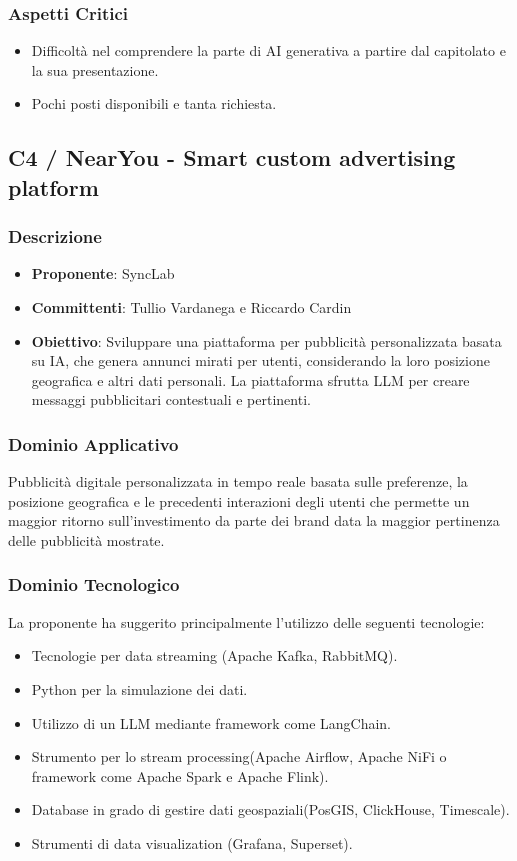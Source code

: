 \documentclass[a4paper, 12pt]{article}
\begin{document}
\subsubsection{Aspetti Critici}
\begin{itemize}
    \item Difficoltà nel comprendere la parte di AI generativa a partire dal capitolato e la sua presentazione.
    \item Pochi posti disponibili e tanta richiesta.
\end{itemize}

\subsection{C4 / NearYou - Smart custom advertising platform}
\subsubsection{Descrizione}
\begin{itemize}
    \item \textbf{Proponente}: SyncLab 
    \item \textbf{Committenti}: Tullio Vardanega e Riccardo Cardin
    \item \textbf{Obiettivo}: Sviluppare una piattaforma per pubblicità personalizzata basata su IA, che genera annunci mirati per utenti, considerando la loro posizione geografica e altri dati personali. La piattaforma sfrutta LLM per creare messaggi pubblicitari contestuali e pertinenti.
\end{itemize}

\subsubsection{Dominio Applicativo}
Pubblicità digitale personalizzata in tempo reale basata sulle preferenze, la posizione geografica e le precedenti interazioni degli utenti che permette un maggior ritorno sull’investimento da parte dei brand data la maggior pertinenza delle pubblicità mostrate.

\subsubsection{Dominio Tecnologico}
La proponente ha suggerito principalmente l’utilizzo delle seguenti tecnologie:
\begin{itemize}
    \item Tecnologie per data streaming (Apache Kafka, RabbitMQ).
    \item Python per la simulazione dei dati.
    \item Utilizzo di un LLM mediante framework come LangChain.
    \item Strumento per lo stream processing(Apache Airflow, Apache NiFi o framework come Apache Spark e Apache Flink).
    \item Database in grado di gestire dati geospaziali(PosGIS, ClickHouse, Timescale).
    \item Strumenti di data visualization (Grafana, Superset).
\end{itemize}
\end{document}
